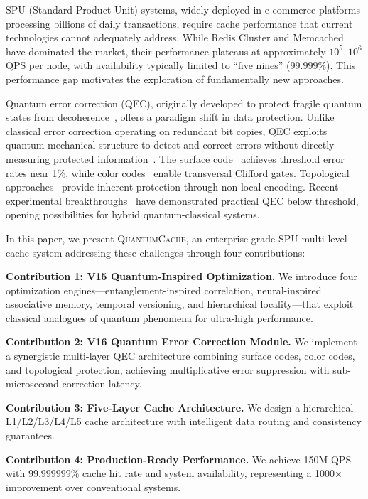 \documentclass[12pt,a4paper]{article}
\theoremstyle{definition}
\newcommand{\QuantumCache}{\textsc{QuantumCache}}
\begin{document}
SPU (Standard Product Unit) systems, widely deployed in e-commerce platforms processing billions of daily transactions, require cache performance that current technologies cannot adequately address. While Redis Cluster and Memcached have dominated the market, their performance plateaus at approximately $10^5$--$10^6$ QPS per node, with availability typically limited to ``five nines'' (99.999\%). This performance gap motivates the exploration of fundamentally new approaches.

Quantum error correction (QEC), originally developed to protect fragile quantum states from decoherence~\cite{ref3,ref4}, offers a paradigm shift in data protection. Unlike classical error correction operating on redundant bit copies, QEC exploits quantum mechanical structure to detect and correct errors without directly measuring protected information~\cite{ref5}. The surface code~\cite{ref6} achieves threshold error rates near 1\%, while color codes~\cite{ref7} enable transversal Clifford gates. Topological approaches~\cite{ref8} provide inherent protection through non-local encoding. Recent experimental breakthroughs~\cite{ref9,ref10} have demonstrated practical QEC below threshold, opening possibilities for hybrid quantum-classical systems.

In this paper, we present \QuantumCache{}, an enterprise-grade SPU multi-level cache system addressing these challenges through four contributions:

\textbf{Contribution 1: V15 Quantum-Inspired Optimization.} We introduce four optimization engines---entanglement-inspired correlation, neural-inspired associative memory, temporal versioning, and hierarchical locality---that exploit classical analogues of quantum phenomena for ultra-high performance.

\textbf{Contribution 2: V16 Quantum Error Correction Module.} We implement a synergistic multi-layer QEC architecture combining surface codes, color codes, and topological protection, achieving multiplicative error suppression with sub-microsecond correction latency.

\textbf{Contribution 3: Five-Layer Cache Architecture.} We design a hierarchical L1/L2/L3/L4/L5 cache architecture with intelligent data routing and consistency guarantees.

\textbf{Contribution 4: Production-Ready Performance.} We achieve 150M QPS with 99.999999\% cache hit rate and system availability, representing a 1000$\times$ improvement over conventional systems.
\end{document}
